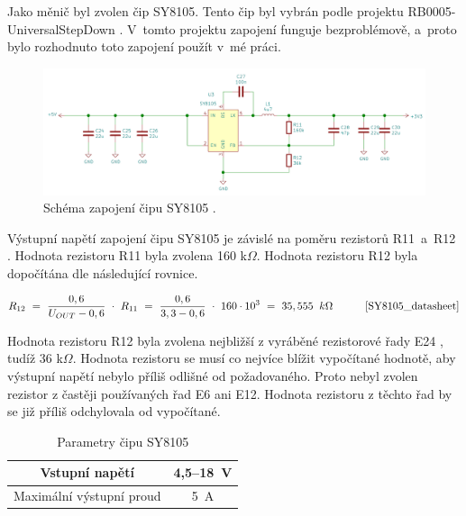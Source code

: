   Jako měnič byl zvolen čip SY8105. Tento čip byl vybrán podle projektu RB0005-UniversalStepDown \cite{UniversalStepDown}. 
  V~tomto projektu zapojení funguje bezproblémově, a~proto bylo rozhodnuto toto zapojení použít v~mé práci. 

  \begin{figure}[!h]
    \begin{center}
      \includegraphics[scale=0.41]{obrazky/SY8105_schema.png}
    \end{center}
    \caption[Schéma zapojení čipu SY8105 \cite{SY8105_datasheet}]{Schéma zapojení čipu SY8105 \cite{SY8105_datasheet}.}
  \end{figure}

  Výstupní napětí zapojení čipu SY8105 je závislé na poměru rezistorů R11~a~R12 \cite{SY8105_datasheet}. 
  Hodnota rezistoru R11 byla zvolena 160 k$\Omega$. Hodnota rezistoru R12 byla dopočítána dle následující rovnice. %

  \begin{equation} 
    R_{12}~=~\frac{0,6}{U_{OUT}-0,6}~\cdot~R_{11}~=~\frac{0,6}{3,3-0,6}~\cdot~160\cdot10^3~=~35,555~\:k\Omega 
    \quad \quad \quad \cite{SY8105_datasheet}
  \end{equation}

  Hodnota rezistoru R12 byla zvolena nejbližší z vyráběné rezistorové řady E24 \cite{Rezistorova_rada}, tudíž 36 k$\Omega$. Hodnota 
  rezistoru se musí co nejvíce blížit vypočítané hodnotě, aby výstupní napětí nebylo příliš odlišné od požadovaného. Proto nebyl
  zvolen rezistor z častěji používaných řad E6 ani E12. Hodnota rezistoru z těchto řad by se již příliš odchylovala od vypočítané.


  \begin{table}[!h]
    \caption{Parametry čipu SY8105 \cite{SY8105_datasheet}}
    \begin{center}
        \begin{tabular}{|c|c|}
            \hline
            Vstupní napětí             & 4,5--18~V \\ 
            \hline
            Maximální výstupní proud   & 5~A \\
            \hline
        \end{tabular}    
    \end{center}
\end{table}

